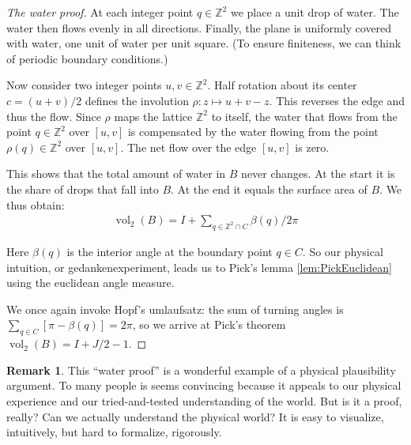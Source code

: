 \documentclass[a4paper]{amsart}
\numberwithin{equation}{section}
\theoremstyle{plain}
\theoremstyle{definition}
\newtheorem{remark}[theorem]{Remark}
\newcommand{\Z}{\mathbb{Z}}
\DeclareMathOperator{\vol}{vol}
\begin{document}
\begin{proof}[The water proof]
  At each integer point $q \in \Z^2$ we place a unit drop of water.
  The water then flows evenly in all directions.  Finally, the plane is
  uniformly covered with water, one unit of water per unit square.
  (To ensure finiteness, we can think of periodic boundary conditions.)

  Now consider two integer points $u,v \in \Z^2$.
  Half rotation about its center $c = (u+v)/2$
  defines the involution $\rho \colon z \mapsto u + v - z$.
  This reverses the edge and thus the flow.
  Since $\rho$ maps the lattice $\Z^2$ to itself,
  the water that flows from the point $q \in \Z^2$ over $[u,v]$ 
  is compensated by the water flowing from the point $\rho(q) \in \Z^2$ over $[u,v]$.
  The net flow over the edge $[u,v]$ is zero.
  
  This shows that the total amount of water in $B$ never changes.
  At the start it is the share of drops that fall into $B$.
  At the end it equals the surface area of $B$.
  We thus obtain:
  \begin{align*}
    \vol_2(B) = I + \sum_{q \in \Z^2 \cap C} \beta(q) / 2\pi
  \end{align*}

  Here $\beta(q)$ is the interior angle at the boundary point $q \in C$.
  So our physical intuition, or gedankenexperiment, leads us to
  Pick's lemma \ref{lem:PickEuclidean} using the euclidean angle measure.

  We once again invoke Hopf's umlaufsatz:
  the sum of turning angles is $\sum_{q \in C} [ \pi - \beta(q) ] = 2\pi$,
  so we arrive at Pick's theorem $\vol_2(B) = I + J/2 - 1$.
\end{proof}



\begin{remark}
  This “water proof” is a wonderful example
  of a physical plausibility argument.
  To many people is seems convincing
  because it appeals to our physical experience
  and our tried-and-tested understanding of the world.
  But is it a proof, really?
  Can we actually understand the physical world?
  It is easy to visualize, intuitively, but hard to formalize, rigorously.
\end{remark}
\end{document}
